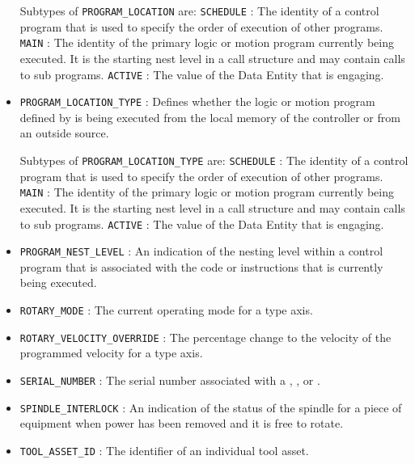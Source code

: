 \begin{itemize}
Subtypes of \texttt{PROGRAM_LOCATION} are: 
\newline\tab \texttt{SCHEDULE} : The identity of a control program that is used to specify the order of execution of other programs. 
\newline\tab \texttt{MAIN} : The identity of the primary logic or motion program currently being executed. It is the starting nest level in a call structure and may contain calls to sub programs. 
\newline\tab \texttt{ACTIVE} : The value of the \gls{Data Entity} that is engaging. 
\item \texttt{PROGRAM_LOCATION_TYPE} : Defines whether the logic or motion program defined by  is being executed from the local memory of the controller or from an outside source. 

Subtypes of \texttt{PROGRAM_LOCATION_TYPE} are: 
\newline\tab \texttt{SCHEDULE} : The identity of a control program that is used to specify the order of execution of other programs. 
\newline\tab \texttt{MAIN} : The identity of the primary logic or motion program currently being executed. It is the starting nest level in a call structure and may contain calls to sub programs. 
\newline\tab \texttt{ACTIVE} : The value of the \gls{Data Entity} that is engaging. 
\item \texttt{PROGRAM_NEST_LEVEL} : An indication of the nesting level within a control program that is associated with the code or instructions that is currently being executed. 

\item \texttt{ROTARY_MODE} : The current operating mode for a  type axis. 

\item \texttt{ROTARY_VELOCITY_OVERRIDE} : The percentage change to the velocity of the programmed velocity for a  type axis. 

\item \texttt{SERIAL_NUMBER} : The serial number associated with a , , or . 

\item \texttt{SPINDLE_INTERLOCK} : An indication of the status of the spindle for a piece of equipment when power has been removed and it is free to rotate. 

\item \texttt{TOOL_ASSET_ID} : The identifier of an individual tool asset. 


\end{itemize}
